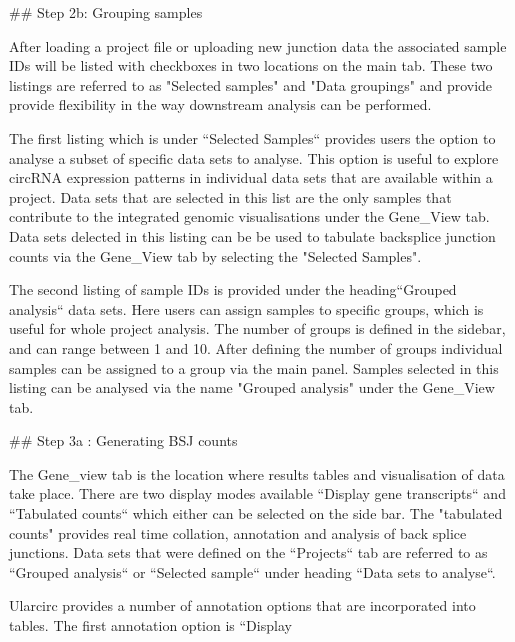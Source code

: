 ## Step 2b: Grouping samples

After loading a project file or uploading new junction data the associated sample IDs will be listed with checkboxes in two locations on the main tab. These two listings are referred to as "Selected samples" and "Data groupings" and provide provide flexibility in the way downstream analysis can be performed.

The first listing which is under ``Selected Samples`` provides users the option to analyse a subset of specific data sets to analyse. This option is useful to explore circRNA expression patterns in individual data sets that are available within a project. Data sets that are selected in this list are the only samples that contribute to the integrated genomic visualisations under the Gene_View tab. Data sets delected in this listing can be be used to tabulate backsplice junction counts via the Gene_View tab by selecting the "Selected Samples". 

The second listing of sample IDs is provided under the heading``Grouped analysis`` data sets. Here users can assign samples to specific groups, which is useful for whole project analysis. The number of groups is defined in the sidebar, and can range between 1 and 10. After defining the number of groups individual samples can be assigned to a group via the main panel. Samples selected in this listing can be analysed via the name "Grouped analysis" under the Gene_View tab.


## Step 3a : Generating BSJ counts

The Gene_view tab is the location where results tables and visualisation of data take place. There are two display modes available ``Display gene transcripts`` and ``Tabulated counts`` which either can be selected on the side bar. The "tabulated counts" provides real time collation, annotation and analysis of back splice junctions. Data sets that were defined on the ``Projects`` tab are referred to as ``Grouped analysis`` or ``Selected sample`` under heading ``Data sets to analyse``.

Ularcirc provides a number of annotation options that are incorporated into tables. The first annotation option is ``Display %

